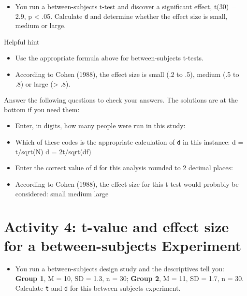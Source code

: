 \documentclass[]{book}
\providecommand{\tightlist}{%
  \setlength{\itemsep}{0pt}\setlength{\parskip}{0pt}}
\begin{document}
\begin{itemize}
\tightlist
\item
  You run a between-subjects t-test and discover a significant effect, t(30) = 2.9, p \textless{} .05. Calculate \texttt{d} and determine whether the effect size is small, medium or large.
\end{itemize}

Helpful hint

\begin{itemize}
\tightlist
\item
  Use the appropriate formula above for between-subjects t-tests.
\item
  According to Cohen (1988), the effect size is small (.2 to .5), medium (.5 to .8) or large (\textgreater{} .8).
\end{itemize}

Answer the following questions to check your answers. The solutions are at the bottom if you need them:

\begin{itemize}
\tightlist
\item
  Enter, in digits, how many people were run in this study: 
\item
  Which of these codes is the appropriate calculation of \texttt{d} in this instance: d = t/sqrt(N) d = 2t/sqrt(df)
\item
  Enter the correct value of \texttt{d} for this analysis rounded to 2 decimal places: 
\item
  According to Cohen (1988), the effect size for this t-test would probably be considered: small medium large
\end{itemize}

\hypertarget{activity-4-t-value-and-effect-size-for-a-between-subjects-experiment}{%
\section{Activity 4: t-value and effect size for a between-subjects Experiment}\label{activity-4-t-value-and-effect-size-for-a-between-subjects-experiment}}

\begin{itemize}
\tightlist
\item
  You run a between-subjects design study and the descriptives tell you: \textbf{Group 1}, M = 10, SD = 1.3, n = 30; \textbf{Group 2}, M = 11, SD = 1.7, n = 30. Calculate \texttt{t} and \texttt{d} for this between-subjects experiment.
\end{itemize}
\end{document}
